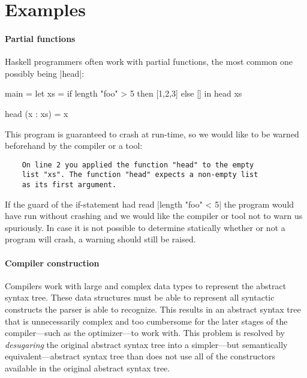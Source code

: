 
\section{Examples}\label{secexamples} %

\paragraph{Partial functions} Haskell programmers often work with partial functions, the most common one possibly being |head|:

\begin{code}
main =  let xs = if length "foo" > 5 then [1,2,3] else []
        in head xs

head (x : xs) = x
\end{code}

This program is guaranteed to crash at run-time, so we would like to be warned beforehand by the compiler or a tool:

\begin{verbatim}
    On line 2 you applied the function "head" to the empty
    list "xs". The function "head" expects a non-empty list
    as its first argument.
\end{verbatim}

If the guard of the if-statement had read |length "foo" < 5| the program would have run without crashing and we would like the compiler or tool not to warn us spuriously. In case it is not possible to determine statically whether or not a program will crash, a warning should still be raised.

\paragraph{Compiler construction}
Compilers work with large and complex data types to represent the abstract syntax tree. These data structures must be able to represent all syntactic constructs the parser is able to recognize. This results in an abstract syntax tree that is unnecessarily complex and too cumbersome for the later stages of the compiler---such as the optimizer---to work with. This problem is resolved by \emph{desugaring} the original abstract syntax tree into a simpler---but semantically equivalent---abstract syntax tree than does not use all of the constructors available in the original abstract syntax tree.

